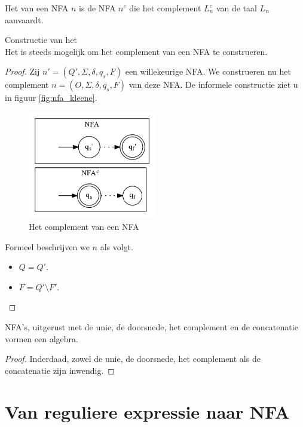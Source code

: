 \documentclass[main.tex]{subfiles}
\begin{document}
\begin{de}
  Het  van een NFA $n$ is de NFA $n^{c}$ die het complement $L_{n}^{c}$ van de taal $L_{n}$ aanvaardt.
\end{de}

\begin{st}
  Constructie van het \\
  Het is steeds mogelijk om het complement van een NFA te construeren.

  \begin{proof}
    Zij $n' = (Q',\Sigma,\delta,q_{s},F)$ een willekeurige NFA. We construeren nu het complement $n = (O,\Sigma,\delta,q_{s},F)$ van deze NFA.
    De informele constructie ziet u in figuur \ref{fig:nfa_kleene}.
    \begin{figure}[H]
      \centering
      \includegraphics[width=0.5\textwidth]{assets/nfa_complement.png}      
      \caption{Het complement van een NFA}
      \label{fig:nfa_complement}
    \end{figure}
    Formeel beschrijven we $n$ als volgt.
    \begin{itemize}
    \item $Q = Q'$.
    \item $F = Q'\setminus F'$.
    \end{itemize}
  \end{proof}
\end{st}

\begin{ei}
  NFA's, uitgerust met de unie, de doorsnede, het complement en de concatenatie vormen een algebra.
  \begin{proof}
    Inderdaad, zowel de unie, de doorsnede, het complement als de concatenatie zijn inwendig.
  \end{proof}
\end{ei}

\section{Van reguliere expressie naar NFA}
\label{sec:van-reguliere-expressie-naar-nfa}
\end{document}
